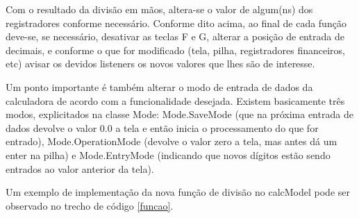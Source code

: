 Com o resultado da divisão em mãos, altera-se o valor de algum(ns) dos registradores conforme necessário. Conforme dito acima, ao final de cada função deve-se, se necessário, desativar as teclas F e G, alterar a posição de entrada de decimais, e conforme o que for modificado (tela, pilha, registradores financeiros, etc) avisar os devidos listeners os novos valores que lhes são de interesse. 

Um ponto importante é também alterar o modo de entrada de dados da calculadora de acordo com a funcionalidade desejada. Existem basicamente três modos, explicitados na classe Mode: Mode.SaveMode (que na próxima entrada de dados devolve o valor 0.0 a tela e então inicia o processamento do que for entrado), Mode.OperationMode (devolve o valor zero a tela, mas antes dá um enter na pilha) e Mode.EntryMode (indicando que novos dígitos estão sendo entrados ao valor anterior da tela). 

Um exemplo de implementação da nova função de divisão no calcModel pode ser observado no trecho de código \ref{funcao}.




% 
%         
%         
%                  
